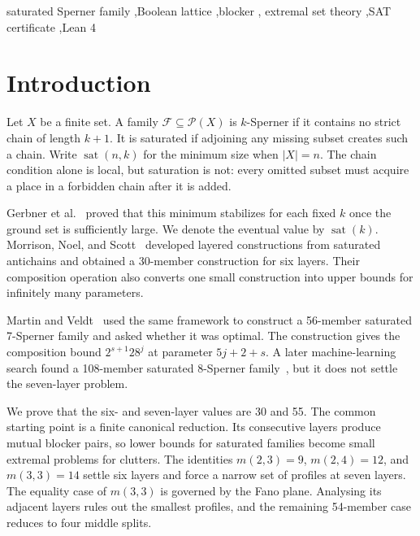 \documentclass[a4paper,fleqn,longmktitle]{cas-sc}
\theoremstyle{definition}
\theoremstyle{remark}
\newcommand{\powerset}{\mathcal{P}}
\newcommand{\family}{\mathcal{F}}
\newcommand{\sat}{\operatorname{sat}}
\begin{document}
\begin{keywords}
saturated Sperner family \sep Boolean lattice \sep blocker \sep
extremal set theory \sep SAT certificate \sep Lean 4
\end{keywords}

\maketitle

\section{Introduction}

Let $X$ be a finite set.  A family $\family\subseteq\powerset(X)$ is
$k$-Sperner if it contains no strict chain of length $k+1$.  It is saturated
if adjoining any missing subset creates such a chain.  Write $\sat(n,k)$ for
the minimum size when $|X|=n$.  The chain condition alone is local, but
saturation is not: every omitted subset must acquire a place in a forbidden
chain after it is added.

Gerbner et al.~\cite{gerbner2013} proved that this minimum stabilizes for each
fixed $k$ once the ground set is sufficiently large.  We denote the eventual
value by $\sat(k)$.  Morrison, Noel, and Scott~\cite{mns2014} developed
layered constructions from saturated antichains and obtained a 30-member
construction for six layers.  Their composition operation also converts one
small construction into upper bounds for infinitely many parameters.

Martin and Veldt~\cite{martinveldt2025} used the same framework to construct a
56-member saturated 7-Sperner family and asked whether it was optimal.  The
construction gives the composition bound $2^{s+1}28^j$ at parameter
$5j+2+s$.  A later machine-learning search found a 108-member saturated
8-Sperner family~\cite{patternboost}, but it does not settle the seven-layer
problem.

We prove that the six- and seven-layer values are 30 and 55.  The common
starting point is a finite canonical reduction.  Its consecutive layers
produce mutual blocker pairs, so lower bounds for saturated families become
small extremal problems for clutters.  The identities
$m(2,3)=9$, $m(2,4)=12$, and $m(3,3)=14$ settle six layers and force a narrow
set of profiles at seven layers.  The equality case of $m(3,3)$ is governed
by the Fano plane.  Analysing its adjacent layers rules out the smallest
profiles, and the remaining 54-member case reduces to four middle splits.
\end{document}
